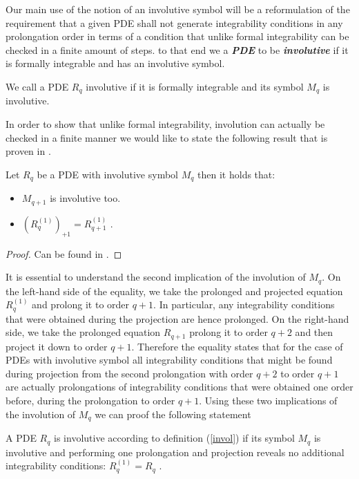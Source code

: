 Our main use of the notion of an involutive symbol will be a reformulation of the requirement that a given PDE shall not generate integrability conditions in any prolongation order in terms of a condition that unlike formal integrability can be checked in a finite amount of steps. to that end we a \textit{\textbf{PDE}} to be \textit{\textbf{involutive}} if it is formally integrable and has an involutive symbol.
\begin{definition} \label{invol}
We call a PDE $R_q$ involutive if it is formally integrable and its symbol $M_q$ is involutive.
\end{definition}
In order to show that unlike formal integrability, involution can actually be checked in a finite manner we would like to state the following result that is proven in \cite{seiler1994analysis}.
\begin{theorem}\label{invoCons}
Let $R_q$ be a PDE with involutive symbol $M_q$ then it holds that:
\begin{itemize}
    \item $M_{q+1}$ is involutive too.
    \item $(R_{q}^{(1)})_{+1} = R_{q+1}^{(1)}$ .
\end{itemize}
\end{theorem}
\begin{proof}
Can be found in \cite{seiler1994analysis}.
\end{proof}
It is essential to understand the second implication of the involution of $M_q$. On the left-hand side of the equality, we take the prolonged and projected equation $R_q^{(1)}$ and prolong it to order $q+1$. In particular, any integrability conditions that were obtained during the projection are hence prolonged. On the right-hand side, we take the prolonged equation $R_{q+1}$ prolong it to order $q+2$ and then project it down to order $q+1$. Therefore the equality states that for the case of PDEs with involutive symbol all integrability conditions that might be found during projection from the second prolongation with order $q+2$ to order $q+1$ are actually prolongations of integrability conditions that were obtained one order before, during the prolongation to order $q+1$.
Using these two implications of the involution of $M_q$ we can proof the following statement
\begin{theorem}
A PDE $R_q$ is involutive according to definition (\ref{invol}) if its symbol $M_q$ is involutive and performing one prolongation and projection reveals no additional integrability conditions: $R_q^{(1)} = R_q$ .
\end{theorem}
